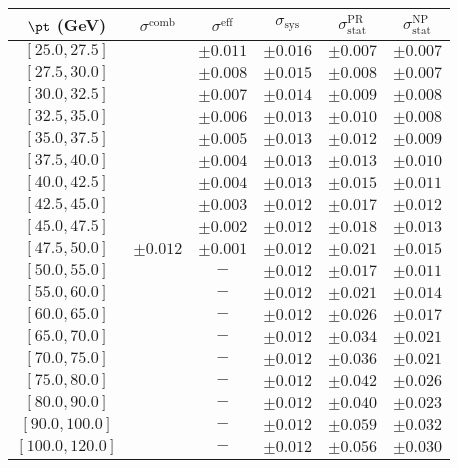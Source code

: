 \begin{tabular}{c||c|c||c|c|c}
$\pt$ (GeV) & $\sigma^{\text{comb}}$ & $\sigma^{\text{eff}}$  & $\sigma_{\text{sys}}$ & $\sigma_{\text{stat}}^{\text{PR}}$  & $\sigma_{\text{stat}}^{\text{NP}}$ \\
\hline
$[25.0, 27.5]$ & \multirow{19}{*}{$\pm0.012$} & $\pm0.011$ & $\pm0.016$ & $\pm0.007$ & $\pm0.007$\\
$[27.5, 30.0]$ &  & $\pm0.008$ & $\pm0.015$ & $\pm0.008$ & $\pm0.007$\\
$[30.0, 32.5]$ &  & $\pm0.007$ & $\pm0.014$ & $\pm0.009$ & $\pm0.008$\\
$[32.5, 35.0]$ &  & $\pm0.006$ & $\pm0.013$ & $\pm0.010$ & $\pm0.008$\\
$[35.0, 37.5]$ &  & $\pm0.005$ & $\pm0.013$ & $\pm0.012$ & $\pm0.009$\\
$[37.5, 40.0]$ &  & $\pm0.004$ & $\pm0.013$ & $\pm0.013$ & $\pm0.010$\\
$[40.0, 42.5]$ &  & $\pm0.004$ & $\pm0.013$ & $\pm0.015$ & $\pm0.011$\\
$[42.5, 45.0]$ &  & $\pm0.003$ & $\pm0.012$ & $\pm0.017$ & $\pm0.012$\\
$[45.0, 47.5]$ &  & $\pm0.002$ & $\pm0.012$ & $\pm0.018$ & $\pm0.013$\\
$[47.5, 50.0]$ &  & $\pm0.001$ & $\pm0.012$ & $\pm0.021$ & $\pm0.015$\\
$[50.0, 55.0]$ &  & $-$ & $\pm0.012$ & $\pm0.017$ & $\pm0.011$\\
$[55.0, 60.0]$ &  & $-$ & $\pm0.012$ & $\pm0.021$ & $\pm0.014$\\
$[60.0, 65.0]$ &  & $-$ & $\pm0.012$ & $\pm0.026$ & $\pm0.017$\\
$[65.0, 70.0]$ &  & $-$ & $\pm0.012$ & $\pm0.034$ & $\pm0.021$\\
$[70.0, 75.0]$ &  & $-$ & $\pm0.012$ & $\pm0.036$ & $\pm0.021$\\
$[75.0, 80.0]$ &  & $-$ & $\pm0.012$ & $\pm0.042$ & $\pm0.026$\\
$[80.0, 90.0]$ &  & $-$ & $\pm0.012$ & $\pm0.040$ & $\pm0.023$\\
$[90.0, 100.0]$ &  & $-$ & $\pm0.012$ & $\pm0.059$ & $\pm0.032$\\
$[100.0, 120.0]$ &  & $-$ & $\pm0.012$ & $\pm0.056$ & $\pm0.030$\\
\end{tabular}
